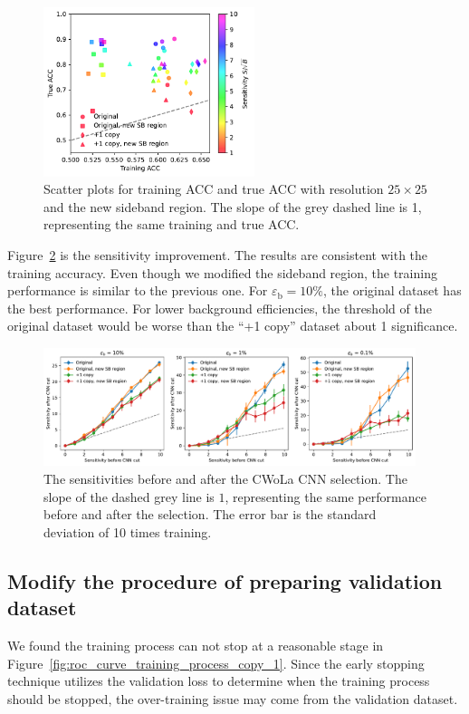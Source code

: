 \documentclass[12pt]{article}
\begin{document}
		\begin{figure}[htpb]
			\centering
			\includegraphics[width=0.55\textwidth]{HVmodel_training_true_acc_origin_copy_1_res_25_new_SB.pdf}
			\caption{Scatter plots for training ACC and true ACC with resolution $25\times 25$ and the new sideband region. The slope of the grey dashed line is 1, representing the same training and true ACC.}
			\label{fig:acc_scatter_new_SB_region}
		\end{figure}

		Figure~\ref{fig:sensitivity_improvement_new_SB_region} is the sensitivity improvement. The results are consistent with the training accuracy. Even though we modified the sideband region, the training performance is similar to the previous one. For $\varepsilon_{\text{b}} = 10 \%$, the original dataset has the best performance. For lower background efficiencies, the threshold of the original dataset would be worse than the ``+1 copy'' dataset about 1 significance.
		\begin{figure}[htpb]
			\centering
			\includegraphics[width=0.97\textwidth]{HVmodel_sensitivity_improvement_origin_copy_1_new_SB.pdf}
			\caption{The sensitivities before and after the CWoLa CNN selection. The slope of the dashed grey line is $1$, representing the same performance before and after the selection. The error bar is the standard deviation of 10 times training.}
			\label{fig:sensitivity_improvement_new_SB_region}
		\end{figure}
	\subsection{Modify the procedure of preparing validation dataset}%
	\label{sub:modify_the_procedure_of_preparing_validation_dataset}
		We found the training process can not stop at a reasonable stage in Figure~\ref{fig:roc_curve_training_process_copy_1}. Since the early stopping technique utilizes the validation loss to determine when the training process should be stopped, the over-training issue may come from the validation dataset.
\end{document}
